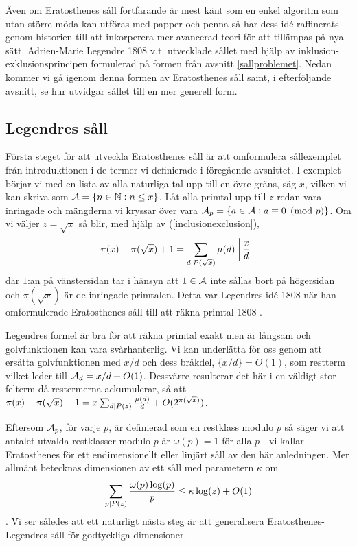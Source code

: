 
Även om Eratosthenes såll fortfarande är mest känt som en enkel algoritm som utan större möda kan utföras med papper och penna så har dess idé raffinerats genom historien till att inkorperera mer avancerad teori för att tillämpas på nya sätt. Adrien-Marie Legendre 1808 v.t. utvecklade sållet med hjälp av inklusion-exklusionsprincipen formulerad på formen från avsnitt \ref{sallproblemet}. Nedan kommer vi gå igenom denna formen av Eratosthenes såll samt, i efterföljande avsnitt, se hur \cite{cojocarumurty} utvidgar sållet till en mer generell form. 

\subsection{Legendres såll}

Första steget för att utveckla Eratosthenes såll är att omformulera sållexemplet från introduktionen i de termer vi definierade i föregående avsnittet. I exemplet börjar vi med en lista av alla naturliga tal upp till en övre gräns, säg $x$, vilken vi kan skriva som $\mathcal{A} = \{n \in \mathbb{N} : n \leq x\}$. Låt alla primtal upp till $z$ redan vara inringade och mängderna vi kryssar över vara \(\mathcal{A}_p = \{a \in \mathcal{A} :  a \equiv 0 \pmod{p}\}\). Om vi väljer $z = \sqrt{x}$ så blir, med hjälp av (\ref{inclusionexclusion}),
\begin{align*}
    \pi(x) - \pi(\sqrt{x}) + 1 = \sum_{d \mid \mathcal{P}(\sqrt{x})} \mu(d) \left\lfloor \frac{x}{d} \right\rfloor  
\end{align*}
där \(1\):an på vänstersidan tar i hänsyn att \(1 \in \mathcal{A}\) inte sållas bort på högersidan och \(\pi(\sqrt{x})\) är de inringade primtalen. Detta var Legendres idé 1808 när han omformulerade Eratosthenes såll till att räkna primtal 1808 \cite{opera}. 

Legendres formel är bra för att räkna primtal exakt men är långsam och golvfunktionen kan vara svårhanterlig. Vi kan underlätta för oss genom att ersätta golvfunktionen med $x/d$ och dess bråkdel, \(\{x/d\} = O(1)\), som restterm vilket leder till \(\mathcal{A}_d = x/d + O(1)\). Dessvärre resulterar det här i en väldigt stor felterm då restermerna ackumulerar, så att \(\pi(x) - \pi(\sqrt{x}) + 1 = x \sum_{d \mid P(z)}\frac{\mu(d)}{d} + O(2^{\pi(\sqrt{x})}) \).

Eftersom \(\mathcal{A}_p\), för varje $p$, är definierad som en restklass modulo $p$ så säger vi att antalet utvalda restklasser modulo $p$ är $\omega(p) = 1$ för alla $p$ - vi kallar Eratosthenes för ett endimensionellt eller linjärt såll av den här anledningen. Mer allmänt betecknas dimensionen av ett såll med parametern \(\kappa\) om 
\begin{align} \label{dimension}
    \sum_{p \mid P(z)} \frac{\omega(p) \log(p)}{p} \leq \kappa \log(z) + O(1)
\end{align}
. Vi ser således att ett naturligt nästa steg är att generalisera Eratosthenes-Legendres såll för godtyckliga dimensioner. 

